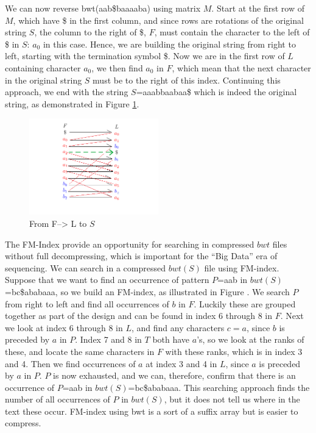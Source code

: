 \documentclass[12pt]{article} %
\begin{document}
We can now reverse bwt(aab\$baaaaba) using matrix $M$. Start at the first row of $M$, which have \$ in the first column, and since rows are rotations of the original string $S$, the column to the right of \$, $F$, must contain the character to the left of \$ in $S$: $a_0$ in this case. Hence, we are building the original string from right to left, starting with the termination symbol \$. Now we are in the first row of $L$ containing character $a_0$, we then find $a_0$ in $F$, which mean that the next character in the original string $S$ must be to the right of this index. Continuing this approach, we end with the string $S$=aaabbaabaa\$ which is indeed the original string, as demonstrated in Figure \ref{fig:bwt0}.
\begin{figure}[H]
    \centering
    \includegraphics[width=0.5\textwidth]{bwt0}
    \captionsetup{width=0.8\textwidth}
    \caption{ From F--> L to $S$}
    \label{fig:bwt0}
\end{figure}

The FM-Index provide an opportunity for searching in compressed $bwt$ files without full decompressing, which is important for the “Big Data” era of sequencing. 
We can search in a compressed $bwt(S)$ file using FM-index. Suppose that we want to find an occurrence of pattern $P$=aab in $bwt(S)$=bc\$ababaaa, so we build an FM-index, as illustrated in Figure \?.  We search $P$ from right to left and find all occurrences of $b$ in $F$. Luckily these are grouped together as part of the design and can be found in index 6 through 8 in $F$. Next we look at index 6 through 8 in $L$, and find any characters $c=a$, since $b$ is preceded by $a$ in $P$. Index 7 and 8 in $T$ both have $a$’s, so we look at the ranks of these, and locate the same characters in $F$ with these ranks, which is in index 3 and 4.  Then we find occurrences of $a$ at index 3 and 4 in $L$, since $a$ is preceded by $a$ in $P$. $P$ is now exhausted, and we can, therefore, confirm that there is an occurrence of $P$=aab in $bwt(S)$=bc\$ababaaa.  This searching approach finds the number of all occurrences of $P$ in $bwt(S)$, but it does not tell us where in the text these occur. 
FM-index using bwt is a sort of a suffix array but is easier to compress. 
\end{document}
